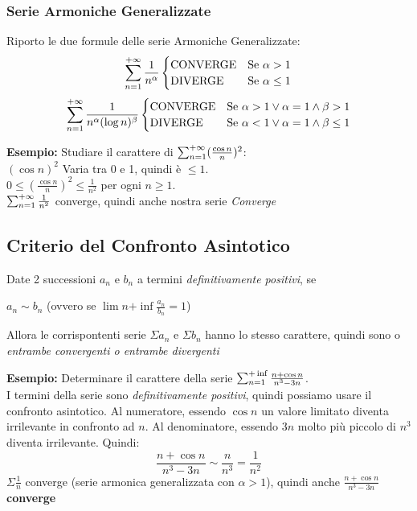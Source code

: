 \documentclass[12pt, a4paper, openany]{book}
\newcommand{\esempio}[1]{\begin{box_esempio} \textbf{Esempio: }#1\end{box_esempio}}
\newcommand{\definizione}[1]{\begin{box_definizione} #1 \end{box_definizione}}
\begin{document}
\subsubsection{Serie Armoniche Generalizzate}
Riporto le due formule delle serie Armoniche Generalizzate:
\begin{equation*}
    \sum_{n=1}^{+\infty} \frac{1}{n^\alpha} \begin{cases}
        \text{CONVERGE} & \text{Se } \alpha > 1 \\ 
        \text{DIVERGE} & \text{Se } \alpha \leq 1 
    \end{cases}
\end{equation*}
\begin{equation*}
    \sum_{n=1}^{+\infty} \frac{1}{n^\alpha (\log n)^\beta} \begin{cases}
        \text{CONVERGE} & \text{Se } \alpha > 1 \vee \alpha = 1 \wedge \beta > 1 \\ 
        \text{DIVERGE} & \text{Se } \alpha < 1 \vee \alpha = 1 \wedge \beta \leq 1
    \end{cases}
\end{equation*}

\esempio{
    Studiare il carattere di $\sum_{n=1}^{+\infty} (\frac{\cos n}{n})^2$:
    \\$(\cos n)^2$ Varia tra 0 e 1, quindi è $\leq 1$.
    \\$0 \leq (\frac{\cos n}{n})^2 \leq \frac{1}{n^2}$ per ogni $n\geq 1$.
    \\$\sum_{n=1}^{+\infty} \frac{1}{n^2}$ converge, quindi anche nostra serie \emph{Converge}
    
}

\subsection{Criterio del Confronto Asintotico}
\definizione{
Date 2 successioni $a_n$ e $b_n$ a termini \emph{definitivamente positivi}, se 
\begin{center}
    $a_n \sim b_n$ (ovvero se $\lim{n}{+\inf} \frac{a_n}{b_n} = 1$)
\end{center}
Allora le corrispontenti serie $\Sigma a_n$ e $\Sigma b_n$ hanno lo stesso carattere, quindi sono o \emph{entrambe convergenti o entrambe divergenti}
}
\esempio{
    Determinare il carattere della serie $\sum_{n=1}^{+\inf} \frac{n+ \cos n}{n^3 - 3n}$.\\
    I termini della serie sono \emph{definitivamente positivi}, quindi possiamo usare il confronto asintotico.
    Al numeratore, essendo $\cos n$ un valore limitato diventa irrilevante in confronto ad $n$.
    Al denominatore, essendo $3n$ molto più piccolo di $n^3$ diventa irrilevante. 
    Quindi:
    \begin{equation*}
        \frac{n+\cos n}{n^3 - 3n} \sim \frac{n}{n^3} = \frac{1}{n^2}
    \end{equation*}
    $\Sigma \frac{1}{n}$ converge (serie armonica generalizzata con $\alpha > 1$), quindi anche $\frac{n+\cos n}{n^3 - 3n}$ \textbf{converge}
}
\end{document}
